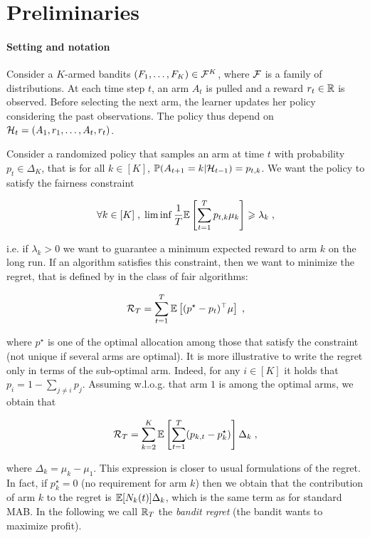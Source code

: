 \section{Preliminaries}

\paragraph{Setting and notation} Consider a $K$-armed bandits $(F_1,\dots, F_K) \in \mathcal{F}^K$, where $\mathcal{F}$ is a family of distributions. At each time step $t$, an arm $A_t$ is pulled and a reward $r_t\in\mathbb{R}$ is observed. Before selecting the next arm, the learner updates her policy considering the past observations. The policy thus depend on $\mathcal{H}_{t}=(A_1,r_1,\dots, A_t, r_t)$.

Consider a randomized policy that samples an arm at time $t$ with probability $p_t \in \Delta_K$, that is for all $k \in [K]$, $\mathbb{P}(A_{t+1}=k | \mathcal{H}_{t-1})=p_{t, k}$. We want the policy to satisfy the fairness constraint

\[\forall k \in [K]\;, \; \liminf \frac{1}{T} \mathbb{E}\left[\sum_{t=1}^T p_{t,k} \mu_k \right] \geqslant \lambda_k \;,\]

i.e. if $\lambda_k>0$ we want to guarantee a minimum expected reward to arm $k$ on the long run. If an algorithm satisfies this constraint, then we want to minimize the regret, that is defined by in the class of fair algorithms:

\[ \mathcal{R}_T = \sum_{t=1}^T \mathbb{E}\left[(p^\star - p_t)^\top\mu \right]\;, \]

where $p^\star$ is one of the optimal allocation among those that satisfy the constraint (not unique if several arms are optimal). It is more illustrative to write the regret only in terms of the sub-optimal arm. Indeed, for any $i\in [K]$ it holds that $p_i = 1-\sum_{j \neq i } p_j$. Assuming w.l.o.g. that arm $1$ is among the optimal arms, we obtain that 

\begin{equation}\label{eq::regret}\mathcal{R}_T =  \sum_{k=2}^K \mathbb{E}\left[\sum_{t=1}^T (p_{k,t} - p^\star_k)\right] \Delta_k \;, \end{equation}

where $\Delta_k = \mu_k - \mu_1$. This expression is closer to usual formulations of the regret. In fact, if $p_k^\star=0$ (no requirement for arm $k$) then we obtain that the contribution of arm $k$ to the regret is $\mathbb{E}[N_k(t)] \Delta_k$, which is the same term as for standard MAB. In the following we call $\mathbb{R}_T$ the \emph{bandit regret} (the bandit wants to maximize profit). 


